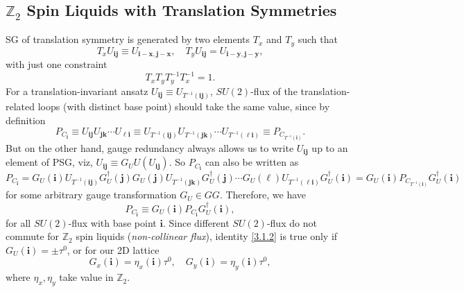\documentclass[10pt,nofootinbib]{revtex4}
\begin{document}
	\subsection{$\mathbb{Z}_2$ Spin Liquids with Translation Symmetries}
		SG of translation symmetry is generated by two elements $T_x$ and $T_y$ such that
		\begin{equation*}
			T_xU_{\bm{ij}}\equiv U_{\bm{i-x,j-x}},\quad T_yU_{\bm{ij}}=U_{\bm{i-y},\bm{j-y}},
		\end{equation*}
		with just one constraint
		\begin{equation}\label{3.1.1}
			T_{x}T_{y}T_y^{-1}T_x^{-1}=1.
		\end{equation}
		\indent For a translation-invariant ansatz $U_{\bm{ij}}\equiv U_{T^{-1}(\bm{ij})}$, $SU(2)$-flux of the translation-related loops (with distinct base point) should take the same value, since by definition
		\begin{equation*}
			P_{C_{\bm{i}}}\equiv U_{\bm{ij}}U_{\bm{jk}}\cdots U_{\bm{\ell i}}\equiv U_{T^{-1}(\bm{ij})}U_{T^{-1}(\bm{jk})}\cdots U_{T^{-1}(\bm{\ell i})}\equiv P_{C_{T^{-1}(\bm{i})}}.
		\end{equation*}
		But on the other hand, gauge redundancy always allows us to write $U_{\bm{ij}}$ up to an element of PSG, viz, $U_{\bm{ij}}\equiv G_UU(U_{\bm{ij}})$. So $P_{C_{\bm{i}}}$ can also be written as
		\begin{equation*}
			P_{C_{\bm{i}}}=G_U(\bm{i})U_{T^{-1}(\bm{ij})}G_U^\dagger(\bm{j})G_U(\bm{j})U_{T^{-1}(\bm{jk})}G_U^\dagger(\bm{j})\cdots G_U(\bm{\ell})U_{T^{-1}(\bm{\ell i})}G_U^\dagger(\bm{i})=G_U(\bm{i})P_{C_{T^{-1}(\bm{i})}}G_U^\dagger(\bm{i})
		\end{equation*}
		for some arbitrary gauge transformation $G_U\in GG$. Therefore, we have
		\begin{equation}\label{3.1.2}
			P_{C_{\bm{i}}}\equiv G_U(\bm{i})P_{C_{\bm{i}}}G_U^\dagger(\bm{i}),
		\end{equation}
		for all $SU(2)$-flux with base point $\bm{i}$. Since  different $SU(2)$-flux do not commute for $\mathbb{Z}_2$ spin liquids (\emph{non-collinear flux}), identity \eqref{3.1.2} is true only if $G_U(\bm{i})=\pm\tau^0$, or for our 2D lattice
		\begin{equation}\label{3.1.3}
			G_x(\bm{i})=\eta_x(\bm{i})\tau^0,\quad G_y(\bm{i})=\eta_y(\bm{i})\tau^0,
		\end{equation}
		where $\eta_x,\eta_y$ take value in $\mathbb{Z}_2$.\par
\end{document}
